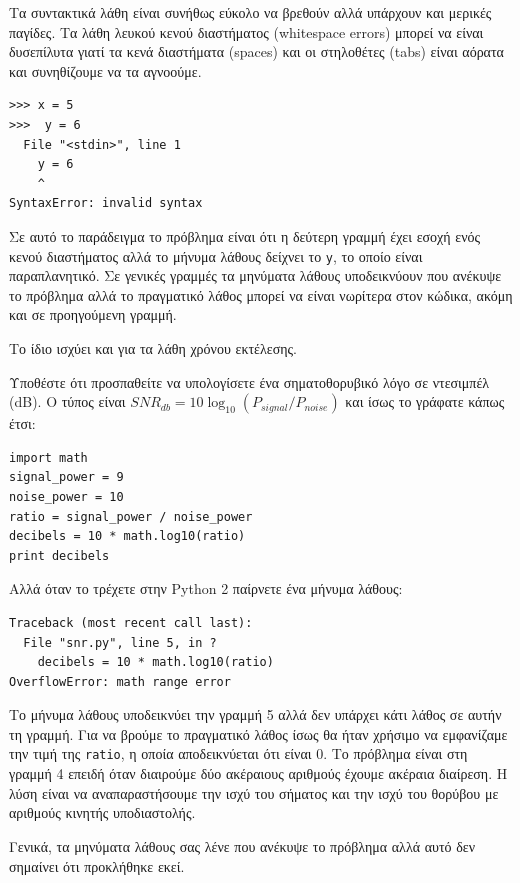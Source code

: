 \documentclass[10pt]{book}
\begin{document}
Τα συντακτικά λάθη είναι συνήθως εύκολο να βρεθούν αλλά υπάρχουν και μερικές
παγίδες. Τα λάθη λευκού κενού διαστήματος (whitespace errors) μπορεί να είναι
δυσεπίλυτα γιατί τα κενά διαστήματα (spaces) και οι στηλοθέτες (tabs) 
είναι αόρατα και συνηθίζουμε να τα αγνοούμε. 

\begin{verbatim}
>>> x = 5
>>>  y = 6
  File "<stdin>", line 1
    y = 6
    ^
SyntaxError: invalid syntax
\end{verbatim}
%

Σε αυτό το παράδειγμα το πρόβλημα είναι ότι η δεύτερη γραμμή έχει
εσοχή ενός κενού διαστήματος αλλά το μήνυμα λάθους δείχνει το {\tt y}, 	
το οποίο είναι παραπλανητικό. Σε γενικές γραμμές τα μηνύματα λάθους υποδεικνύουν που ανέκυψε το πρόβλημα αλλά το πραγματικό λάθος μπορεί να είναι νωρίτερα στον κώδικα, ακόμη και σε προηγούμενη γραμμή.

Το ίδιο ισχύει και για τα λάθη χρόνου εκτέλεσης.

Υποθέστε ότι προσπαθείτε να υπολογίσετε ένα σηματοθορυβικό λόγο σε ντεσιμπέλ (dB). Ο τύπος είναι $SNR_{db} = 10 \log_{10} (P_{signal} / P_{noise})$ και ίσως το γράφατε κάπως έτσι:

\begin{verbatim}
import math
signal_power = 9
noise_power = 10
ratio = signal_power / noise_power
decibels = 10 * math.log10(ratio)
print decibels
\end{verbatim}
%

Αλλά όταν το τρέχετε στην  Python 2 παίρνετε ένα μήνυμα λάθους: 

\begin{verbatim}
Traceback (most recent call last):
  File "snr.py", line 5, in ?
    decibels = 10 * math.log10(ratio)
OverflowError: math range error
\end{verbatim}
%

Το μήνυμα λάθους υποδεικνύει την γραμμή 5 αλλά δεν υπάρχει
κάτι λάθος σε αυτήν τη γραμμή. Για να βρούμε το πραγματικό λάθος
ίσως θα ήταν χρήσιμο να εμφανίζαμε την τιμή της {\tt ratio},
η οποία αποδεικνύεται ότι είναι 0. Το πρόβλημα είναι στη γραμμή 4
επειδή όταν διαιρούμε δύο ακέραιους αριθμούς έχουμε ακέραια διαίρεση.
Η λύση είναι να αναπαραστήσουμε την ισχύ του σήματος και την ισχύ του
θορύβου με αριθμούς κινητής υποδιαστολής.

Γενικά, τα μηνύματα λάθους σας λένε που ανέκυψε το πρόβλημα αλλά
αυτό δεν σημαίνει ότι προκλήθηκε εκεί.
\end{document}
